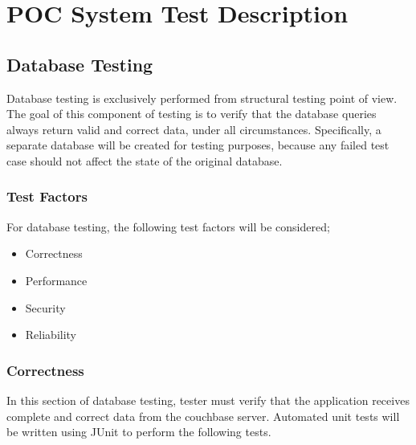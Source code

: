 \documentclass[12pt]{article}
\begin{document}
%
%

\section{POC System Test Description}

\subsection{Database Testing}
Database testing is exclusively performed from structural testing point of view. The goal of this component of testing is to verify that the database queries always return valid and correct data, under all circumstances. Specifically, a separate database will be created for testing purposes, because any failed test case should not affect the state of the original database. 
\subsubsection{Test Factors}
For database testing, the following test factors will be considered;
\begin{itemize}
 \item Correctness
 \item Performance
 \item Security
 \item Reliability
 \end{itemize}
 
\subsubsection{Correctness}
In this section of database testing, tester must verify that the application receives complete and correct data from the couchbase server. Automated unit tests will be written using JUnit to perform the following tests.
\end{document}
